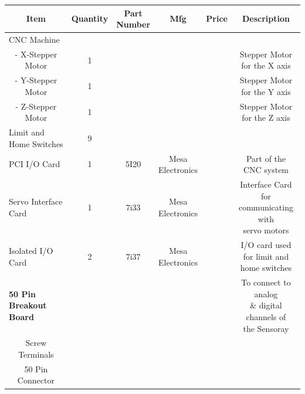 \documentclass[12pt]{article}
\begin{document}
\begin{adjustwidth}{-2cm}{-2cm}

\begin{center}


\begin{tabular}{ |c|c|c|c|c|c| }


  \hline
  \textbf{Item} & \textbf{Quantity} & \thead{Part \\ Number} & \textbf{Mfg} & \textbf{Price} & \textbf{Description} \\  \hline
  \multicolumn{1}{|l|}{CNC Machine} & & & & &  \\ \hline 
  - X-Stepper Motor & 1 & & & & \makecell{Stepper Motor \\ for the X axis}  \\ \hline
  - Y-Stepper Motor & 1 & & & & \makecell{Stepper Motor \\ for the Y axis}  \\ \hline
  - Z-Stepper Motor & 1 & & & & \makecell{Stepper Motor \\ for the Z axis} \\ \hline
  
  \multicolumn{1}{|l|}{Limit and Home Switches} & 9 & & & &  \\ \hline
 
  \multicolumn{1}{|l|}{PCI I/O Card} & 1 & 5I20 & \makecell{Mesa \\ Electronics} & & \makecell{Part of the \\ CNC system}   \\ \hline
  \multicolumn{1}{|l|}{Servo Interface Card} & 1 & 7i33 & \makecell{Mesa \\ Electronics} & & \makecell{Interface Card for \\ communicating with \\ servo motors}
   \\ \hline
  \multicolumn{1}{|l|}{Isolated I/O Card} & 2 & 7i37 & \makecell{Mesa \\ Electronics} & & \makecell{I/O card used \\ for limit and \\ home switches}
  \\ \hline
  \multicolumn{1}{|l|}{\textbf{50 Pin Breakout Board}} & & & & & \makecell{To connect to analog \\ \& digital channels of \\ the Sensoray} \\ \hline  
  \multicolumn{1}{|c|}{Screw Terminals} & & & & & \\ \hline  
  \multicolumn{1}{|c|}{50 Pin Connector} & & & & & \\ \hline  
  

\end{tabular}
\end{center}
\end{adjustwidth}
\end{document}
